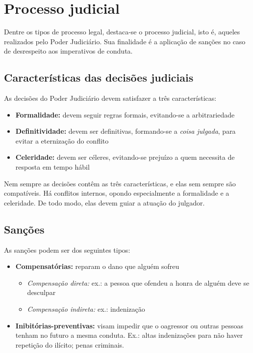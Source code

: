 \documentclass{article}
\begin{document}
\section{Processo judicial}

Dentre os tipos de processo legal, destaca-se o processo judicial, isto é, aqueles realizados pelo Poder Judiciário. Sua finalidade é a aplicação de sanções no caso de desrespeito aos imperativos de conduta.

\subsection{Características das decisões judiciais}

As decisões do Poder Judiciário devem satisfazer a três características:

\begin{itemize}
    \item \textbf{Formalidade:} devem seguir regras formais, evitando-se a arbitrariedade
    \item \textbf{Definitividade:} devem ser definitivas, formando-se a \textit{coisa julgada}, para evitar a eternização do conflito
    \item \textbf{Celeridade:} devem ser céleres, evitando-se prejuízo a quem necessita de resposta em tempo hábil
\end{itemize}

Nem sempre as decisões contêm as três características, e elas sem sempre são compatíveis. Há conflitos internos, opondo especialmente a formalidade e a celeridade. De todo modo, elas devem guiar a atuação do julgador.

\subsection{Sanções}

As sanções podem ser dos seguintes tipos:

\begin{itemize}
    \item \textbf{Compensatórias:} reparam o dano que alguém sofreu
    \begin{itemize}
        \item \textit{Compensação direta:} ex.: a pessoa que ofendeu a honra de alguém deve se desculpar
        \item \textit{Compensação indireta:} ex.: indenização
    \end{itemize}
    \item \textbf{Inibitórias-preventivas:} visam impedir que o oagressor ou outras pessoas tenham no futuro a mesma conduta. Ex.: altas indenizações para não haver repetição do ilícito; penas criminais.
\end{itemize}
\end{document}
